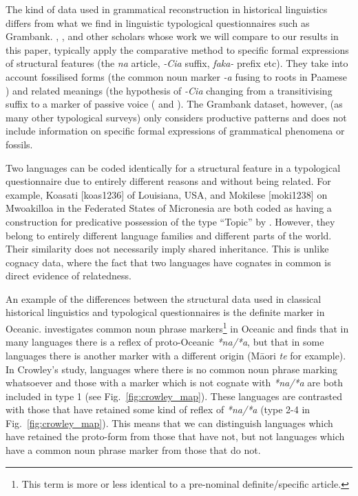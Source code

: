 \documentclass[a4paper,10pt]{article} %
\begin{document}
The kind of data used in grammatical reconstruction in historical linguistics differs from what we find in linguistic typological questionnaires such as Grambank. \citet{crowley1985common}, \citet{clark1976aspects}, and other scholars whose work we will compare to our results in this paper, typically apply the comparative method to specific formal expressions of structural features (the \emph{na} article, \emph{-Cia} suffix, \emph{faka-} prefix etc). They take into account fossilised forms (the common noun marker \emph{-a} fusing to roots in Paamese \citep[141]{crowley1985common}) and related meanings (the hypothesis of \emph{-Cia} changing from a transitivising suffix to a marker of passive voice (\citet{hale_1968, hohepa_1967, hohepa_1969, chung1978} and \citet{jonsson1998}). The Grambank dataset, however, (as many other typological surveys) only considers productive patterns and does not include information on specific formal expressions of grammatical phenomena or fossils.

Two languages can be coded identically for a structural feature in a typological questionnaire due to entirely different reasons and without being related. For example, Koasati [koas1236] of Louisiana, USA, and Mokilese [moki1238] on Mwoakilloa in the Federated States of Micronesia are both coded as having a construction for predicative possession of the type ``Topic'' by \citet{wals-2011-117}. However, they belong to entirely different language families and different parts of the world. Their similarity does not necessarily imply shared inheritance. This is unlike cognacy data, where the fact that two languages have cognates in common is direct evidence of relatedness.

An example of the differences between the structural data used in classical historical linguistics and typological questionnaires is the definite marker in Oceanic. \citet{crowley1985common} investigates common noun phrase markers\footnote{This term is more or less identical to a pre-nominal definite/specific article.} in Oceanic and finds that in many languages there is a reflex of proto-Oceanic \emph{*na/*a}, but that in some languages there is another marker with a different origin (M\={a}ori \emph{te} for example). In Crowley's study, languages where there is no common noun phrase marking whatsoever and those with a marker which is not cognate with \emph{*na/*a} are both included in type 1 (see Fig.~\ref{fig:crowley_map}). These languages are contrasted with those that have retained some kind of reflex of \emph{*na/*a} (type 2-4 in Fig.~\ref{fig:crowley_map}). This means that we can distinguish languages which have retained the proto-form from those that have not, but not languages which have a common noun phrase marker from those that do not.
\end{document}
